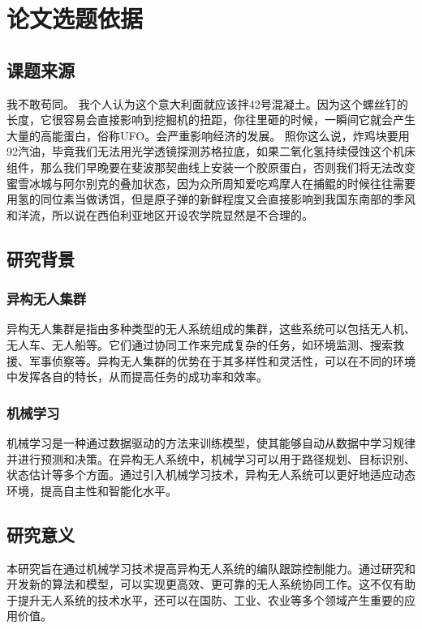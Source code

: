 \begin{cabstract}
\end{cabstract}
\hspace{1cm}
    
{\let\clearpage\relax \chapter{论文选题依据}}
\section{课题来源}
我不敢苟同。 我个人认为这个意大利面就应该拌42号混凝土。因为这个螺丝钉的长度，它很容易会直接影响到挖掘机的扭距，你往里砸的时候，一瞬间它就会产生大量的高能蛋白，俗称UFO。会严重影响经济的发展。 照你这么说，炸鸡块要用92汽油，毕竟我们无法用光学透镜探测苏格拉底，如果二氧化氢持续侵蚀这个机床组件，那么我们早晚要在斐波那契曲线上安装一个胶原蛋白，否则我们将无法改变蜜雪冰城与阿尔别克的叠加状态，因为众所周知爱吃鸡摩人在捕鲲的时候往往需要用氢的同位素当做诱饵，但是原子弹的新鲜程度又会直接影响到我国东南部的季风和洋流，所以说在西伯利亚地区开设农学院显然是不合理的。
\section{研究背景}
\subsection{异构无人集群}
异构无人集群是指由多种类型的无人系统组成的集群，这些系统可以包括无人机、无人车、无人船等。它们通过协同工作来完成复杂的任务，如环境监测、搜索救援、军事侦察等。异构无人集群的优势在于其多样性和灵活性，可以在不同的环境中发挥各自的特长，从而提高任务的成功率和效率。

\subsection{机械学习}
机械学习是一种通过数据驱动的方法来训练模型，使其能够自动从数据中学习规律并进行预测和决策。在异构无人系统中，机械学习可以用于路径规划、目标识别、状态估计等多个方面。通过引入机械学习技术，异构无人系统可以更好地适应动态环境，提高自主性和智能化水平。
\section{研究意义}
本研究旨在通过机械学习技术提高异构无人系统的编队跟踪控制能力。通过研究和开发新的算法和模型，可以实现更高效、更可靠的无人系统协同工作。这不仅有助于提升无人系统的技术水平，还可以在国防、工业、农业等多个领域产生重要的应用价值。
